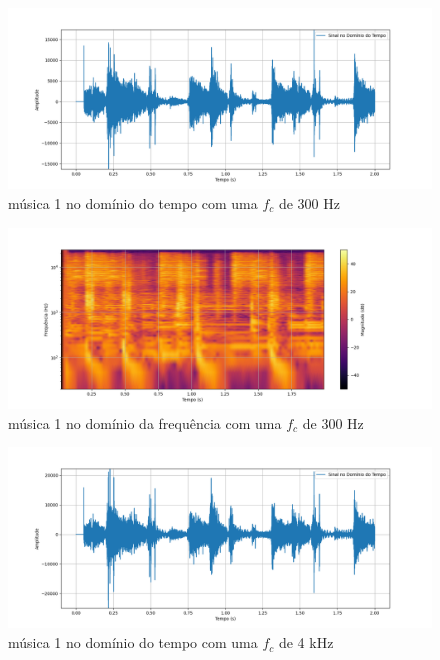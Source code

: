 \begin{anexosenv}
\begin{figure}[h]
	\centering
    \includegraphics[width=\textwidth]{figuras/fig26.png}
	\caption{música 1 no domínio do tempo com uma $f_c$ de 300 Hz}
	\label{fig26}
\end{figure}

\begin{figure}[h]
	\centering
    \includegraphics[width=\textwidth]{figuras/fig27.png}
	\caption{música 1 no domínio da frequência com uma $f_c$ de 300 Hz}
	\label{fig27}
\end{figure}

\begin{figure}[h]
	\centering
    \includegraphics[width=\textwidth]{figuras/fig28.png}
	\caption{música 1 no domínio do tempo com uma $f_c$ de 4 kHz}
	\label{fig28}
\end{figure}


\end{anexosenv}
